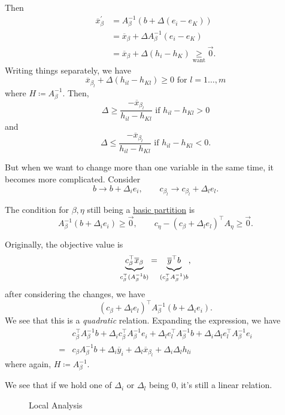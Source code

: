 Then
\[
	\begin{split}
		\overline{x}_{\beta}^\prime &= A_{\beta}^{-1}(b+\Delta(e_{i} - e_K))\\
		&= \overline{x}_{\beta}+\Delta A^{-1}_{\beta}(e_{i} - e_K)\\
		&= \overline{x}_{\beta}+\Delta(h_{i} - h_K)\underset{\text{want}}{\geq} \vec{0}.
	\end{split}
\]
Writing things separately, we have
\[
	\overline{x}_{\beta_l} + \Delta(h_{il} - h_{Kl}) \geq 0 \text{ for }l = 1\ldots , m
\]
where \(H\coloneqq A^{-1}_{\beta}\).
Then,
\[
	\Delta\geq \frac{-\overline{x}_{\beta_l}}{h_{il} - h_{Kl}} \text{ if }h_{il} - h_{Kl} > 0
\]
and
\[
	\Delta\leq \frac{-\overline{x}_{\beta_l}}{h_{il} - h_{Kl}} \text{ if }h_{il} - h_{Kl} < 0.
\]

But when we want to change more than one variable in the same time, it becomes more complicated. Consider
\[
	b\to b+\Delta_{i}e_{i}, \qquad c_{\beta_l}\to c_{\beta_l} + \Delta_l e_l.
\]

The condition for \(\beta, \eta\) still being a \hyperref[def:basic-partition]{basic partition} is
\[
	A_{\beta}^{-1}(b+\Delta_{i}e_{i})\geq \vec{0}, \qquad c_{\eta} - (c_{\beta}+\Delta_l e_l)^{\top}A_{\eta}\geq \vec{0}.
\]

Originally, the objective value is
\[
	\underbrace{c_{\beta}^{\top} \overline{x}_{\beta}}_{c_{\beta}^{\top}(A^{-1}_{\beta}b)} = \underbrace{\vphantom{c_{\beta}^{\top}}\overline{y}^{\top}b}_{(c_{\beta}^{\top}A^{-1}_{\beta})b},
\]
after considering the changes, we have
\[
	(c_{\beta}+\Delta_l e_l)^{\top}A^{-1}_{\beta}(b+\Delta_{i}e_{i}).
\]
We see that this is a \emph{quadratic} relation. Expanding the expression, we have
\[
	\begin{split}
		&c_{\beta}^{\top}A^{-1}_{\beta}b + \Delta_{i}c_{\beta}^{\top}A^{-1}_{\beta}e_{i}+\Delta_{l}e_{l}^{\top}A^{-1}_{\beta}b+\Delta_i \Delta_l e_{l}^{\top}A^{-1}_{\beta}e_{i}\\
		=& c_{\beta}A^{-1}_{\beta}b+\Delta_{i}\overline{y}_{i}+\Delta_l \overline{x}_{\beta_l}+\Delta_{i}\Delta_l h_{li}
	\end{split}
\]
where again, \(H\coloneqq A^{-1}_{\beta}\).
\begin{remark}
	We see that if we hold one of \(\Delta_i\) or \(\Delta_l\) being \(0\), it's still a linear relation.
\end{remark}

\begin{figure}[H]
	\centering
	\caption{Local Analysis}
	\label{fig:local-analysis}
\end{figure}

